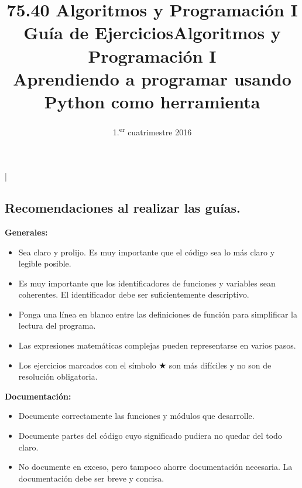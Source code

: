 \documentclass[11pt,spanish,a4paper,twoside,openany]{book}
\title{75.40 Algoritmos y Programación I \\
    \textbf{Guía de Ejercicios}}
\date{1.\textsuperscript{er} cuatrimestre 2016}
\theoremstyle{definition}
\theoremstyle{definition}
\theoremstyle{remark}
\begin{document}
\begin{extract*}
\lstMakeShortInline[style=inlinecode]|
\end{extract*}

\begin{extract} %
\maketitle
\thispagestyle{empty}

\newpage

\section*{Recomendaciones al realizar las guías.}

\textbf{Generales:}
\begin{itemize}
	\item Sea claro y prolijo. Es muy importante que el código sea lo más claro y legible posible.
	\item Es muy importante que los identificadores de funciones y variables sean coherentes. El identificador debe ser suficientemente descriptivo.
	\item Ponga una línea en blanco entre las definiciones de función para simplificar la lectura del programa.
	\item Las expresiones matemáticas complejas pueden representarse en varios pasos.
	\item Los ejercicios marcados con el símbolo $\bigstar$ son más difíciles y no son de resolución obligatoria.
\end{itemize}

\textbf{Documentación:}
\begin{itemize}
	\item Documente correctamente las funciones y módulos que desarrolle.
	\item Documente partes del código cuyo significado pudiera no quedar del todo claro.
	\item No documente en exceso, pero tampoco ahorre documentación necesaria. La documentación debe ser breve y concisa.
\end{itemize}
\end{extract}

%
\title{Algoritmos y Programación I \\ Aprendiendo a programar usando Python como herramienta}
\date{}
\maketitle
\end{document}
